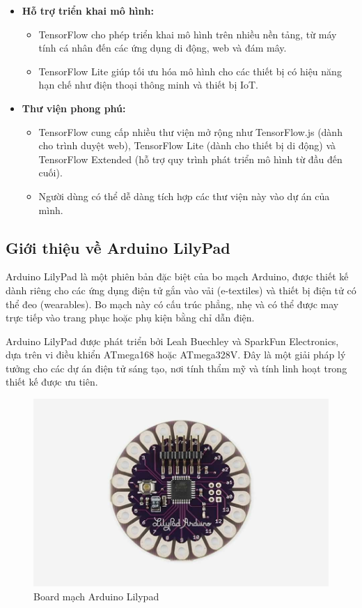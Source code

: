 \begin{itemize}
\begin{itemize}
    \end{itemize}
    \item \textbf{Hỗ trợ triển khai mô hình:}
    \begin{itemize}
        \item TensorFlow cho phép triển khai mô hình trên nhiều nền tảng, từ máy tính cá nhân đến các ứng dụng di động, web và đám mây.
        \item TensorFlow Lite giúp tối ưu hóa mô hình cho các thiết bị có hiệu năng hạn chế như điện thoại thông minh và thiết bị IoT.
    \end{itemize}
    \item \textbf{Thư viện phong phú:} 
    \begin{itemize}
        \item TensorFlow cung cấp nhiều thư viện mở rộng như TensorFlow.js (dành cho trình duyệt web), TensorFlow Lite (dành cho thiết bị di động) và TensorFlow Extended (hỗ trợ quy trình phát triển mô hình từ đầu đến cuối).
        \item Người dùng có thể dễ dàng tích hợp các thư viện này vào dự án của mình.
    \end{itemize}
\end{itemize}

\subsection{Giới thiệu về Arduino LilyPad}
\indent Arduino LilyPad là một phiên bản đặc biệt của bo mạch Arduino, được thiết kế dành riêng cho các ứng dụng điện tử gắn vào vải (e-textiles) và thiết bị điện tử có thể đeo (wearables). Bo mạch này có cấu trúc phẳng, nhẹ và có thể được may trực tiếp vào trang phục hoặc phụ kiện bằng chỉ dẫn điện.

\indent Arduino LilyPad được phát triển bởi Leah Buechley và SparkFun Electronics, dựa trên vi điều khiển ATmega168 hoặc ATmega328V. Đây là một giải pháp lý tưởng cho các dự án điện tử sáng tạo, nơi tính thẩm mỹ và tính linh hoạt trong thiết kế được ưu tiên.
\begin{figure}[H]
    \centering
    \includegraphics[width=\textwidth,height=\textheight,keepaspectratio]{Images/Theoretical basis/lilypad_main.jpg}
    \caption{Board mạch Arduino Lilypad}
    \label{fig:enter-label}
\end{figure}

